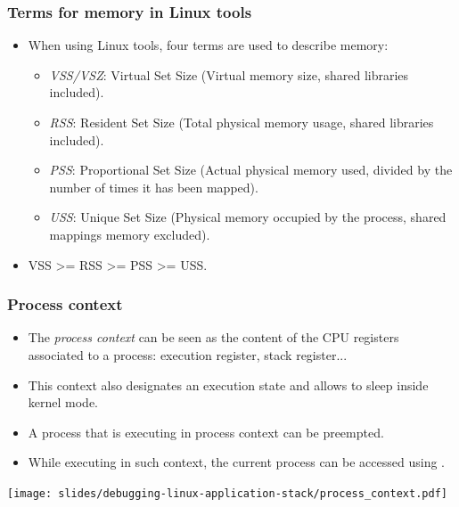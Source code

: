 \begin{frame}[fragile]
  \frametitle{Terms for memory in Linux tools}
  \begin{itemize}
    \item When using Linux tools, four terms are used to describe memory:
    \begin{itemize}
      \item {\em VSS/VSZ}: Virtual Set Size (Virtual memory size, shared libraries
            included).
      \item {\em RSS}: Resident Set Size (Total physical memory usage, shared
            libraries included).
      \item {\em PSS}: Proportional Set Size (Actual physical memory used, divided
            by the number of times it has been mapped).
      \item {\em USS}: Unique Set Size (Physical memory occupied by the process,
            shared mappings memory excluded).
    \end{itemize}
    \item VSS >= RSS >= PSS >= USS.
  \end{itemize}
\end{frame}

\begin{frame}
  \frametitle{Process context}
  \begin{itemize}
    \item The \emph{process context} can be seen as the content of
    the CPU registers associated to a process: execution register, stack register...
    \item This context also designates an execution state and allows to sleep
          inside kernel mode.
    \item A process that is executing in process context can be preempted.
    \item While executing in such context, the current process
           can be accessed using .
  \end{itemize}
  \vspace{0.5cm}
  \texttt{[image: slides/debugging-linux-application-stack/process\_context.pdf]}
\end{frame}

